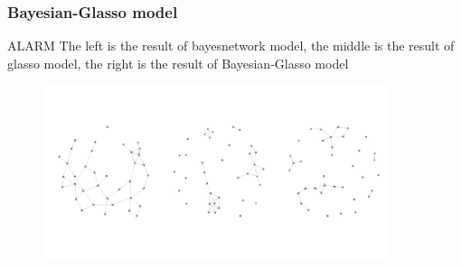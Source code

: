 \documentclass{beamer}
\begin{document}
\begin{frame}
\frametitle{Bayesian-Glasso model}
  \begin{block}{ALARM}
  The left is the result of bayesnetwork model, the middle is the result of glasso model, the right is the result of Bayesian-Glasso model
 \begin{center}
 \begin{figure}
     \includegraphics[width=0.9\textwidth, height=0.7\textheight]{alarm.jpeg}

    \end{figure}
\end{center}
  \end{block}


\end{frame}
\end{document}
